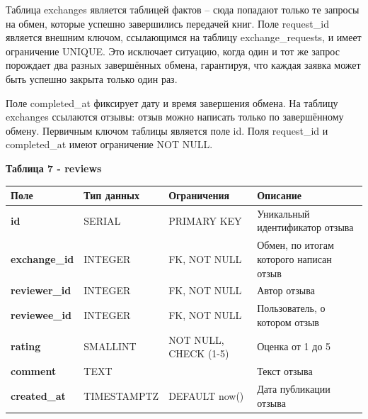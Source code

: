 \documentclass[14pt,a4paper]{extarticle}
\begin{document}
Таблица exchanges является таблицей фактов -- сюда попадают только те
запросы на обмен, которые успешно завершились передачей книг. Поле
request\_id является внешним ключом, ссылающимся на таблицу
exchange\_requests, и имеет ограничение UNIQUE. Это исключает ситуацию,
когда один и тот же запрос порождает два разных завершённых обмена,
гарантируя, что каждая заявка может быть успешно закрыта только один
раз.

Поле completed\_at фиксирует дату и время завершения обмена. На таблицу
exchanges ссылаются отзывы: отзыв можно написать только по завершённому
обмену. Первичным ключом таблицы является поле id. Поля request\_id и
completed\_at имеют ограничение NOT NULL.

\newpage
\textbf{Таблица 7 - reviews}

\begin{longtable}[]{@{}
  >{\centering\arraybackslash}p{}
  >{\centering\arraybackslash}p{}
  >{\centering\arraybackslash}p{}
  >{\centering\arraybackslash}p{}@{}}
\toprule\noalign{}
\begin{minipage}[b]{\linewidth}\centering
\textbf{Поле}
\end{minipage} & \begin{minipage}[b]{\linewidth}\centering
\textbf{Тип данных}
\end{minipage} & \begin{minipage}[b]{\linewidth}\centering
\textbf{Ограничения}
\end{minipage} & \begin{minipage}[b]{\linewidth}\centering
\textbf{Описание}
\end{minipage} \\
\midrule\noalign{}
\endhead
\bottomrule\noalign{}
\endlastfoot
\textbf{id} & SERIAL & PRIMARY KEY & Уникальный идентификатор отзыва \\
\textbf{exchange\_id} & INTEGER & FK, NOT NULL & Обмен, по итогам
которого написан отзыв \\
\textbf{reviewer\_id} & INTEGER & FK, NOT NULL & Автор отзыва \\
\textbf{reviewee\_id} & INTEGER & FK, NOT NULL & Пользователь, о котором
отзыв \\
\textbf{rating} & SMALLINT & NOT NULL, CHECK (1-5) & Оценка от 1 до 5 \\
\textbf{comment} & TEXT & & Текст отзыва \\
\textbf{created\_at} & TIMESTAMPTZ & DEFAULT now() & Дата публикации
отзыва \\
\end{longtable}
\end{document}
